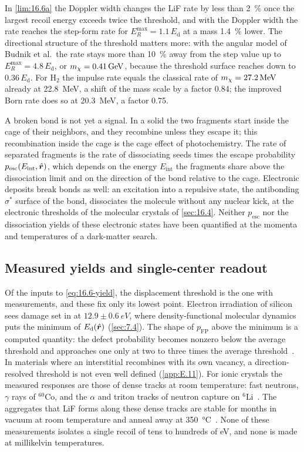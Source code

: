 In \cref{lim:16.6a} the Doppler width changes the LiF rate by less than \SI{2}{\percent} once the largest recoil energy exceeds twice the threshold, and with the Doppler width the rate reaches the step-form rate for $E_R^{\max} = 1.1\,E_{\mathrm{d}}$ at a mass \SI{1.4}{\percent} lower. The directional structure of the threshold matters more: with the angular model of Budnik et al.\ the rate stays more than \SI{10}{\percent} away from the step value up to $E_R^{\max} = 4.8\,E_{\mathrm{d}}$, or $m_{\chi} = \SI{0.41}{GeV}$, because the threshold surface reaches down to $0.36\,E_{\mathrm{d}}$. For H$_2$ the impulse rate equals the classical rate of $m_{\chi} = \SI{27.2}{MeV}$ already at \SI{22.8}{MeV}, a shift of the mass scale by a factor 0.84; the improved Born rate does so at \SI{20.3}{MeV}, a factor 0.75.

A broken bond is not yet a signal. In a solid the two fragments start inside the cage of their neighbors, and they recombine unless they escape it; this recombination inside the cage is the cage effect of photochemistry. The rate of separated fragments is the rate of dissociating seeds times the escape probability $p_{\mathrm{esc}}(E_{\mathrm{int}},\hat{\bm{r}})$, which depends on the energy $E_{\mathrm{int}}$ the fragments share above the dissociation limit and on the direction of the bond relative to the cage. Electronic deposits break bonds as well: an excitation into a repulsive state, the antibonding $\sigma^*$ surface of the bond, dissociates the molecule without any nuclear kick, at the electronic thresholds of the molecular crystals of \cref{sec:16.4}. Neither $p_{\mathrm{esc}}$ nor the dissociation yields of these electronic states have been quantified at the momenta and temperatures of a dark-matter search.

\subsection{Measured yields and single-center readout}\label{sec:16.6-yields}

Of the inputs to \cref{eq:16.6-yield}, the displacement threshold is the one with measurements, and these fix only its lowest point. Electron irradiation of silicon sees damage set in at $12.9 \pm \SI{0.6}{eV}$, where density-functional molecular dynamics puts the minimum of $E_{\mathrm{d}}(\hat{\bm{r}})$ (\cref{sec:7.4}). The shape of $p_{\mathrm{FP}}$ above the minimum is a computed quantity: the defect probability becomes nonzero below the average threshold and approaches one only at two to three times the average threshold~\cite[Sect.~II]{cogswell2021passive}. In materials where an interstitial recombines with its own vacancy, a direction-resolved threshold is not even well defined (\cref{app:E.11}). For ionic crystals the measured responses are those of dense tracks at room temperature: fast neutrons, $\gamma$ rays of $^{60}$Co, and the $\alpha$ and triton tracks of neutron capture on $^6$Li~\cite{araujo2026nuclear}. The aggregates that LiF forms along these dense tracks are stable for months in vacuum at room temperature and anneal away at \SI{350}{\celsius}~\cite[Sect.~III]{araujo2026nuclear}. None of these measurements isolates a single recoil of tens to hundreds of eV, and none is made at millikelvin temperatures.

